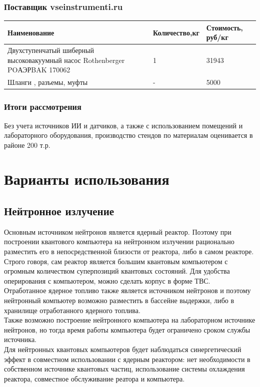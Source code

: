 \documentclass[11pt]{report}
\begin{document}
\subsection{Поставщик vseinstrumenti.ru} 
\begin{tabular}{|p{5.5cm}|p{3.0cm}|p{3cm}|}
\hline
	Наименование & Количество,кг & Стоимость, руб/кг \\
\hline
	Двухступенчатый шиберный высоковакуумный насос Rothenberger POАЭРBAK 170062  & 1 & 31943 \\
\hline
	Шланги , разъемы, муфты  & - & 5000 \\
\hline	
\end{tabular}


\subsection{Итоги рассмотрения} 
Без учета источников ИИ и датчиков, а также с использованием помещений и лабораторного оборудования,  производство стендов по материалам оценивается в районе 200 т.р.


\chapter{Варианты использования}
\section{Нейтронное излучение}
Основным источником нейтронов является ядерный реактор. Поэтому при построении квантового компьютера на  нейтронном излучении рационально разместить его в непосредственной близости от реактора, либо в самом реакторе. Строго говоря, сам реактор является большим квантовым компьютером с огромным количеством суперпозиций квантовых состояний. Для удобства оперирования с компьютером, можно сделать корпус в форме ТВС. \\
Отработанное ядерное топливо также является источником нейтронов и поэтому нейтронный компьютер возможно разместить в бассейне выдержки, либо в хранилище отработанного ядерного топлива. \\
Также возможно построение нейтронного компьютера на лабораторном источнике нейтронов, но тогда время работы компьютера будет ограничено сроком службы источника.\\

Для нейтронных квантовых компьютеров будет наблюдаться синергетический эффект в совместном использовании с ядерным реактором: нет необходимости в собственном источнике квантовых частиц, использование системы охлаждения реактора, совместное обслуживание реатора и компьютера.
\end{document}
